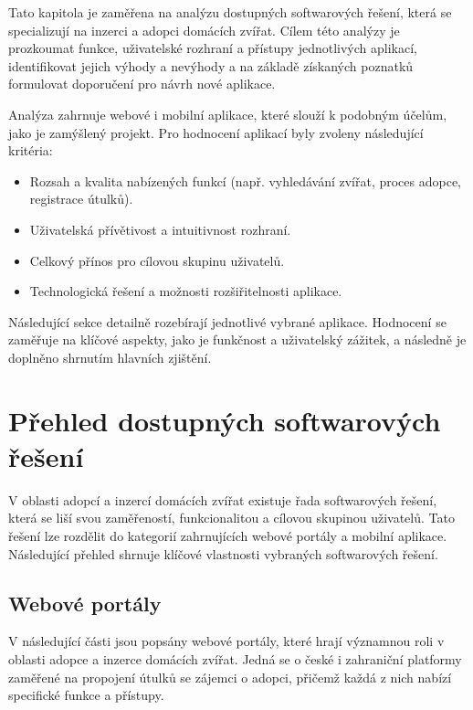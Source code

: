 \documentclass[czech, bp, kiv, he, iso690numb, pdf]{fasthesis}
\begin{document}
    Tato kapitola je zaměřena na analýzu dostupných softwarových řešení, která se specializují na inzerci a adopci domácích zvířat. Cílem této analýzy je prozkoumat funkce, uživatelské rozhraní a přístupy jednotlivých aplikací, identifikovat jejich výhody a nevýhody a na základě získaných poznatků formulovat doporučení pro návrh nové aplikace.

    Analýza zahrnuje webové i mobilní aplikace, které slouží k podobným účelům, jako je zamýšlený projekt. Pro hodnocení aplikací byly zvoleny následující kritéria:
    \begin{itemize}
        \item Rozsah a kvalita nabízených funkcí (např. vyhledávání zvířat, proces adopce, registrace útulků).
        \item Uživatelská přívětivost a intuitivnost rozhraní.
        \item Celkový přínos pro cílovou skupinu uživatelů.
        \item Technologická řešení a možnosti rozšiřitelnosti aplikace.
    \end{itemize}
    Následující sekce detailně rozebírají jednotlivé vybrané aplikace. Hodnocení se zaměřuje na klíčové aspekty, jako je funkčnost a uživatelský zážitek, a následně je doplněno shrnutím hlavních zjištění.

    \section{Přehled dostupných softwarových řešení}

    V oblasti adopcí a inzercí domácích zvířat existuje řada softwarových řešení, která se liší svou zaměřeností, funkcionalitou a cílovou skupinou uživatelů. Tato řešení lze rozdělit do kategorií zahrnujících webové portály a mobilní aplikace. Následující přehled shrnuje klíčové vlastnosti vybraných softwarových řešení.

    \subsection{Webové portály}

    V následující části jsou popsány webové portály, které hrají významnou roli v oblasti adopce a inzerce domácích zvířat. Jedná se o české i zahraniční platformy zaměřené na propojení útulků se zájemci o adopci, přičemž každá z nich nabízí specifické funkce a přístupy.
\end{document}
